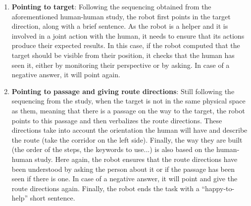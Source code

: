 \documentclass[a4paper,11pt,twoside]{StyleThese}
\begin{document}
\begin{enumerate}
	\item \textbf{Pointing to target}: Following the sequencing obtained from the aforementioned human-human study, the robot first points in the target direction, along with a brief sentence. As the robot is a helper and it is involved in a joint action with the human, it needs to ensure that its actions produce their expected results. In this case, if the robot computed that the target should be visible from their position, it checks that the human has seen it, either by monitoring their perspective or by asking. In case of a negative answer, it will point again.\label{steps:ensuring}
	\item \textbf{Pointing to passage and giving route directions}: Still following the sequencing from the study, when the target is not in the same physical space as them, meaning that there is a passage on the way to the target, the robot points to this passage and then verbalizes the route directions. These directions take into account the orientation the human will have and describe the route (\eg take the corridor on the left side). Finally, the way they are built (\ie the order of the steps, the keywords to use...) is also based on the human-human study. Here again, the robot ensures that the route directions have been understood by asking the person about it or if the passage has been seen if there is one.
	In case of a negative answer, it will point and give the route directions again. Finally, the robot ends the task with a ``happy-to-help'' short sentence.\label{steps:passage}
\end{enumerate}
\end{document}
